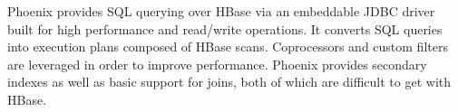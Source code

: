 \documentclass{vldb}
\begin{document}
Phoenix provides SQL querying over HBase via an embeddable JDBC driver built for high performance and read/write operations. It 
converts SQL queries into execution plans composed of HBase scans. Coprocessors and custom filters are  leveraged
in order to improve performance.  Phoenix provides secondary indexes as  well as basic support for joins, both of which are difficult to get with HBase. 






\balance
\end{document}
